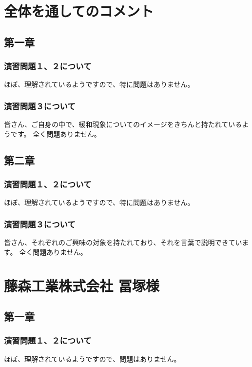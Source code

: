 \documentclass[uplatex,dvipdfmx,a4paper,11pt]{jsreport}
\begin{document}
\section*{全体を通してのコメント}
\subsection*{第一章}
\subsubsection*{演習問題１、２について}
ほぼ、理解されているようですので、特に問題はありません。

\subsubsection*{演習問題３について}

皆さん、ご自身の中で、緩和現象についてのイメージをきちんと持たれているようです。
全く問題ありません。

\subsection*{第二章}
\subsubsection*{演習問題１、２について}
ほぼ、理解されているようですので、特に問題はありません。



\subsubsection*{演習問題３について}

皆さん、それぞれのご興味の対象を持たれており、それを言葉で説明できています。
全く問題ありません。



\clearpage

\section*{藤森工業株式会社 冨塚様}
\subsection*{第一章}
\subsubsection*{演習問題１、２について}
ほぼ、理解されているようですので、問題はありません。
\end{document}
